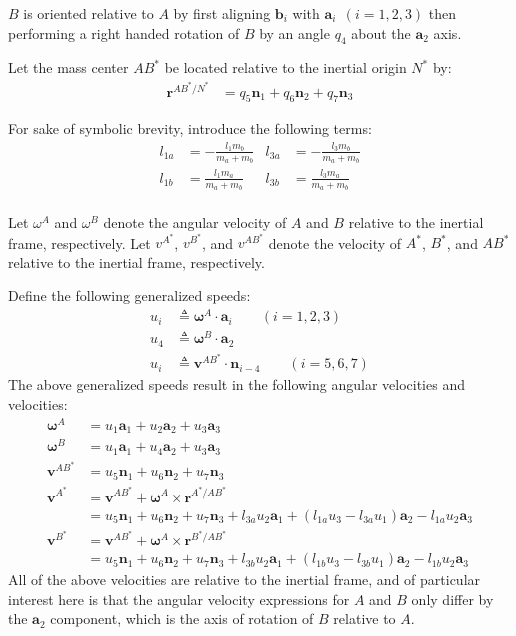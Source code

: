 \documentclass[letterpaper,11pt]{article}
\newcommand{\bs}[1]{ \boldsymbol{ #1 } }
\begin{document}
$B$ is oriented relative to $A$ by first aligning $\bs{b}_i$ with $\bs{a}_i
\:\: (i = 1,2,3)$ then performing a right handed rotation of $B$ by an angle
$q_4$ about the $\bs{a}_2$ axis.

Let the mass center $AB^*$ be located relative to the inertial origin $N^*$ by:
\begin{align*}
  \bs{r}^{AB^*/N^*} & = q_5 \bs{n}_1 + q_6 \bs{n}_2 + q_7 \bs{n}_3
\end{align*}

For sake of symbolic brevity, introduce the following terms:
\begin{align*}
  l_{1a} & = -\frac{l_1 m_b}{m_a + m_b} &
  l_{3a} & = -\frac{l_3 m_b}{m_a + m_b} \\
  l_{1b} & = \frac{l_1 m_a}{m_a + m_b} &
  l_{3b} & = \frac{l_3 m_a}{m_a + m_b} \\
\end{align*}

Let $\omega^A$ and $\omega^B$ denote the angular velocity of $A$ and $B$
relative to the inertial frame, respectively.  Let $v^{A^*}$, $v^{B^*}$, and $v^{AB^*}$ denote the
velocity of $A^*$, $B^*$, and $AB^*$ relative to the inertial frame,
respectively.

Define the following generalized speeds:
\begin{align}
  u_i & \triangleq \bs{\omega}^A \cdot \bs{a}_i  \qquad  (i = 1,2,3) \label{u_defs1} \\
  u_4 & \triangleq \bs{\omega}^B \cdot \bs{a}_2 \label{u_defs2} \\
  u_i & \triangleq \bs{v}^{AB^*} \cdot \bs{n}_{i-4} \qquad  (i = 5,6,7) \label{u_defs3}
\end{align}
The above generalized speeds result in the following angular velocities and
velocities:
\begin{align*}
  \bs{\omega}^A & = u_1 \bs{a}_1 + u_2 \bs{a}_2 + u_3 \bs{a}_3 \\
  \bs{\omega}^B & = u_1 \bs{a}_1 + u_4 \bs{a}_2 + u_3 \bs{a}_3 \\
  \bs{v}^{AB^*} & = u_5 \bs{n}_1 + u_6 \bs{n}_2 + u_7 \bs{n}_3 \\
  \bs{v}^{A^*}  & = \bs{v}^{AB^*} + \bs{\omega}^A \times \bs{r}^{A^*/AB^*} \\
  & = u_5 \bs{n}_1 + u_6 \bs{n}_2 + u_7 \bs{n}_3 +l_{3a}u_2\bs{a}_1 +
  (l_{1a}u_3 - l_{3a}u_1)\bs{a}_2 - l_{1a}u_2\bs{a}_3 \\
  \bs{v}^{B^*}  & = \bs{v}^{AB^*} + \bs{\omega}^A \times \bs{r}^{B^*/AB^*} \\
  & = u_5 \bs{n}_1 + u_6 \bs{n}_2 + u_7 \bs{n}_3 +l_{3b}u_2\bs{a}_1 +
  (l_{1b}u_3 - l_{3b}u_1)\bs{a}_2 - l_{1b}u_2\bs{a}_3
\end{align*}
All of the above velocities are relative to the inertial frame, and of particular
interest here is that the angular velocity expressions for $A$ and $B$ only
differ by the $\bs{a}_2$ component, which is the axis of rotation of $B$
relative to $A$.
\end{document}
